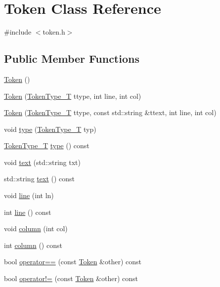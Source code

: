 \hypertarget{class_token}{
\section{Token Class Reference}
\label{class_token}
}


{\ttfamily \#include $<$token.h$>$}

\subsection*{Public Member Functions}
\begin{DoxyCompactItemize}
\item 
\hyperlink{class_token_aa3c5868ba4115f3189df6b2ac5b36f39}{Token} ()
\item 
\hyperlink{class_token_a0b787b39aed3baf7cad3e3e68ed29fa6}{Token} (\hyperlink{token_8h_abf05bcc4c1b09928131e6afd3b768a77}{TokenType\_\-T} ttype, int line, int col)
\item 
\hyperlink{class_token_a19ae35e10dd99fca08017e0f883b1d6c}{Token} (\hyperlink{token_8h_abf05bcc4c1b09928131e6afd3b768a77}{TokenType\_\-T} ttype, const std::string \&ttext, int line, int col)
\item 
void \hyperlink{class_token_af7a5db637926db45f92522f7bc207207}{type} (\hyperlink{token_8h_abf05bcc4c1b09928131e6afd3b768a77}{TokenType\_\-T} typ)
\item 
\hyperlink{token_8h_abf05bcc4c1b09928131e6afd3b768a77}{TokenType\_\-T} \hyperlink{class_token_a94ffaaf2ec54ac87397607e9af567df8}{type} () const 
\item 
void \hyperlink{class_token_a30e84cfd0f4ac2c71f59366088787d8e}{text} (std::string txt)
\item 
std::string \hyperlink{class_token_ae8915cc9838cf9e08ff6c7c39fd81ed2}{text} () const 
\item 
void \hyperlink{class_token_aa9f8fb673aae6d36dad03e3f5d1e5f77}{line} (int ln)
\item 
int \hyperlink{class_token_a8e3d3bce7ab65c33abadab8fc0aa2f46}{line} () const 
\item 
void \hyperlink{class_token_a1b21e17c8d9b12f84147656d03492b57}{column} (int col)
\item 
int \hyperlink{class_token_ae814a8d1293aa3e17fcff49a655fde92}{column} () const 
\item 
bool \hyperlink{class_token_a4b0d7419c692350d4b28b947956e7e82}{operator==} (const \hyperlink{class_token}{Token} \&other) const 
\item 
bool \hyperlink{class_token_a44c1e0a6d1880cb378e7b43178db4e08}{operator!=} (const \hyperlink{class_token}{Token} \&other) const 
\end{DoxyCompactItemize}


